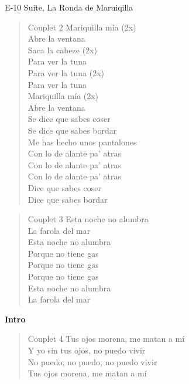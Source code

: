 \begin{song}[vals]{E-10 Suite, La Ronda de Maruiqilla}
\begin{verse}{Couplet 2}
\chord{}Mariquilla mía (2x)\\
Abre la ventana\\
\chord{}Saca la cabeze (2x) \\
Para ver la tuna\\
\chord{}Para ver la tuna (2x)\\
Para ver la tuna\\
\chord{}Mariquilla mía (2x)\\
Abre la ventana\\
\chord{}Se dice que sabes coser \hspace{1em} \\
\chord{}Se dice que sabes bordar \hspace{1em} \\
\chord{}Me has hecho unos pantalones\\
Con lo de alante pa' atras\\
\chord{}Con lo de alante pa' atras\hspace{1em} \\
\chord{}Con lo de alante pa' atras\hspace{1em} \\
\chord{}Dice que sabes coser\\
Dice que sabes bordar\\
\end{verse}
\begin{verse}{Couplet 3}
\chord{}Esta noche no alumbra\\
La farola del mar\\
\chord{}Esta noche no alumbra\\
Porque no tiene gas\\
\chord{}Porque no tiene gas\\
\chord{}Porque no tiene gas\\
\chord{}Esta noche no alumbra\\
La farola del mar\\
\end{verse}
\textbf{Intro}\\
\begin{verse}{Couplet 4}
\chord{}Tus ojos morena, me matan a mí\\
\chord{}Y yo sin tus ojos, no puedo vivir \\
No puedo, no puedo, no puedo vivir\\
\chord{}Tus ojos morena, me matan a mí\\
\end{verse}


\end{song}
